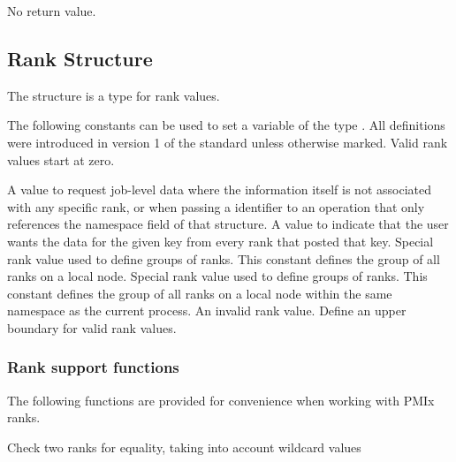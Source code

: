 No return value.


\subsection{Rank Structure}

The  structure is a  type for rank values.


The following constants can be used to set a variable of the type . All definitions were introduced in version 1 of the standard unless otherwise marked. Valid rank values start at zero.

\begin{constantdesc}
%
A value to request job-level data where the information itself is not associated with any specific rank, or when passing a  identifier to an operation that only references the namespace field of that structure.
%
A value to indicate that the user wants the data for the given key from every rank that posted that key.
%
Special rank value used to define groups of ranks.
This constant defines the group of all ranks on a local node.
%
Special rank value used to define groups of ranks.
This constant defines the group of all ranks on a local node within the same namespace as the current process.
%
An invalid rank value.
%
Define an upper boundary for valid rank values.
%
\end{constantdesc}


\subsubsection{Rank support functions}

The following functions are provided for convenience when working with \ac{PMIx} ranks.


Check two ranks for equality, taking into account wildcard values

